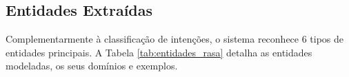 \documentclass{report}
\begin{document}

\subsection{Entidades Extraídas}

Complementarmente à classificação de intenções, o sistema reconhece 6 tipos de entidades principais. A Tabela \ref{tab:entidades_rasa} detalha as entidades modeladas, os seus domínios e exemplos.
\end{document}
